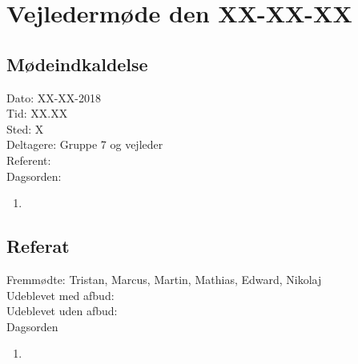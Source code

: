 \section{Vejledermøde den XX-XX-XX}
\subsection{Mødeindkaldelse}
Dato: XX-XX-2018
\\Tid: XX.XX
\\Sted: X
\\Deltagere: Gruppe 7 og vejleder
\\Referent: 
\\Dagsorden:
\begin{enumerate}
    \item 
\end{enumerate}

\subsection{Referat}
 Fremmødte: Tristan, Marcus, Martin, Mathias, Edward, Nikolaj 
 \\Udeblevet med afbud:
 \\Udeblevet uden afbud: 
 \\Dagsorden 
 
 \begin{enumerate}
    \item 
\end{enumerate}